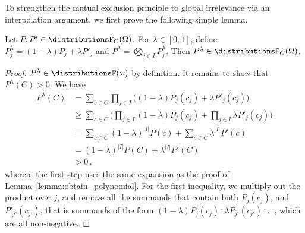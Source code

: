 \documentclass[USenglish,onecolumn]{article}
\begin{document}
To strengthen the mutual exclusion principle to global irrelevance via an interpolation argument, we first prove the following simple lemma.

\begin{lemma}
  \label{lemma:C_positivity_preserved}
  Let $P, P' \in \distributionsF_{C}(\Omg)$.
  For $\lambda \in [0, 1]$, define $P^{\lambda}_j = (1 - \lambda) P_j + \lambda P'_j$ and $P^{\lambda} = \bigotimes_{j \in I} P^{\lambda}_j$.
  Then $P^{\lambda} \in \distributionsF_{C}(\Omg)$.
\end{lemma}

\begin{proof}
    $P^\lambda\in\distributionsF(\omg)$ by definition. It remains to show that $P^\lambda(C)>0$.
  We have
  \begin{align*}
    P^{\lambda}(C) &= \sum_{c \in C} \prod_{j \in I} \Big( (1 - \lambda)P_j(c_j) + \lambda P'_{j}(c_j) \Big)  \\
    & \geq \sum_{c \in C} \Bigg( \prod_{j \in I} (1 - \lambda) P_j(c_j)  + \prod_{j \in I}  \lambda P'_j(c_j) \Bigg)  \\
    &= \sum_{c \in C} (1 - \lambda)^{|I|} P(c) + \sum_{c \in C} \lambda^{|I|}P'(c) \\
    &= (1 - \lambda)^{|I|} P(C) + \lambda^{|I|} P'(C) \\
    &> 0\,,
  \end{align*}
  wherein the first step uses the same expansion as the proof of Lemma~\ref{lemma:obtain_polynomial}.
  For the first inequality, we multiply out the product over $j$, and remove all the summands that contain both $P_j(c_j)$, and $P'_{j'}(c_{j'})$, that is summands of the form $(1-\lambda)P_j(c_j)\cdot\lambda P_{j'}(c_{j'})\cdot \dots$, which are all non-negative.
\end{proof}
\end{document}
